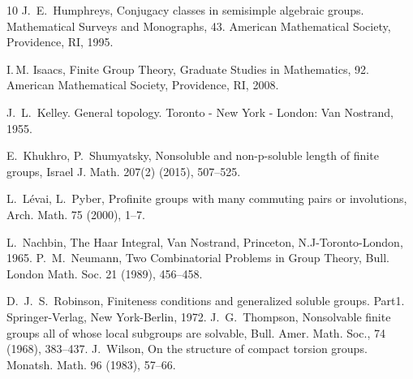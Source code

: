 \documentclass[12pt]{amsart}
\begin{document}
\begin{thebibliography}{10}
J.~E.~Humphreys,  Conjugacy classes in semisimple algebraic groups. Mathematical Surveys and Monographs, 43. American Mathematical Society, Providence, RI, 1995.

  I.\,M. Isaacs, Finite Group Theory, Graduate Studies in Mathematics, 92.
American Mathematical Society, Providence, RI, 2008.
 
 J.~L.~Kelley. General topology. Toronto - New York - London: Van Nostrand, 1955.

  E.~Khukhro,  P.~Shumyatsky,  {Nonsoluble and non-p-soluble length of finite groups}, Israel J. Math. {207(2)} (2015), 507--525.

 L.~L\'evai, L.~Pyber, {Profinite groups with many commuting pairs or involutions}, Arch. Math. 75 (2000), 1--7.

 L.~Nachbin,  The Haar Integral, Van Nostrand, Princeton, N.J-Toronto-London, 1965.
 P.~M.~Neumann, Two Combinatorial Problems in Group Theory, Bull.
 London Math. Soc. { 21}  (1989), 456--458.

 D.~J.~S.~Robinson, Finiteness conditions and generalized soluble groups. Part1. Springer-Verlag, New York-Berlin, 1972.
 J.~G.~Thompson, Nonsolvable finite groups all of whose local subgroups are solvable,  Bull. Amer. Math. Soc., 74 (1968), 383--437.
  J.~Wilson,  On the structure of compact torsion groups. Monatsh. Math. 96 (1983),
57--66.
\end{thebibliography}
\end{document}
